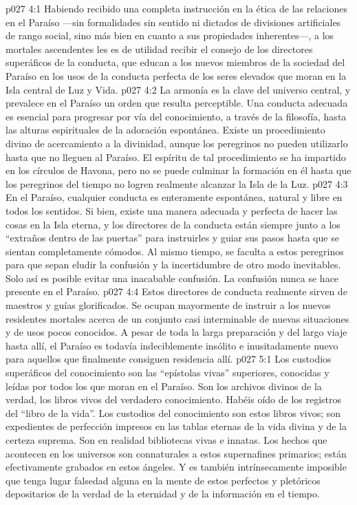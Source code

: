 \vs p027 4:1 Habiendo recibido una completa instrucción en la ética de las relaciones en el Paraíso ---sin formalidades sin sentido ni dictados de divisiones artificiales de rango social, sino más bien en cuanto a sus propiedades inherentes---, a los mortales ascendentes les es de utilidad recibir el consejo de los directores superáficos de la conducta, que educan a los nuevos miembros de la sociedad del Paraíso en los usos de la conducta perfecta de los seres elevados que moran en la Isla central de Luz y Vida.
\vs p027 4:2 La armonía es la clave del universo central, y prevalece en el Paraíso un orden que resulta perceptible. Una conducta adecuada es esencial para progresar por vía del conocimiento, a través de la filosofía, hasta las alturas espirituales de la adoración espontánea. Existe un procedimiento divino de acercamiento a la divinidad, aunque los peregrinos no pueden utilizarlo hasta que no lleguen al Paraíso. El espíritu de tal procedimiento se ha impartido en los círculos de Havona, pero no se puede culminar la formación en él hasta que los peregrinos del tiempo no logren realmente alcanzar la Isla de la Luz.
\vs p027 4:3 En el Paraíso, cualquier conducta es enteramente espontánea, natural y libre en todos los sentidos. Si bien, existe una manera adecuada y perfecta de hacer las cosas en la Isla eterna, y los directores de la conducta están siempre junto a los “extraños dentro de las puertas” para instruirles y guiar sus pasos hasta que se sientan completamente cómodos. Al mismo tiempo, se faculta a estos peregrinos para que sepan eludir la confusión y la incertidumbre de otro modo inevitables. Solo así es posible evitar una inacabable confusión. La confusión nunca se hace presente en el Paraíso.
\vs p027 4:4 Estos directores de conducta realmente sirven de maestros y guías glorificados. Se ocupan mayormente de instruir a los nuevos residentes mortales acerca de un conjunto casi interminable de nuevas situaciones y de usos pocos conocidos. A pesar de toda la larga preparación y del largo viaje hasta allí, el Paraíso es todavía indeciblemente insólito e inusitadamente nuevo para aquellos que finalmente consiguen residencia allí.
\vs p027 5:1 Los custodios superáficos del conocimiento son las “epístolas vivas” superiores, conocidas y leídas por todos los que moran en el Paraíso. Son los archivos divinos de la verdad, los libros vivos del verdadero conocimiento. Habéis oído de los registros del “libro de la vida”. Los custodios del conocimiento son estos libros vivos; son expedientes de perfección impresos en las tablas eternas de la vida divina y de la certeza suprema. Son en realidad bibliotecas vivas e innatas. Los hechos que acontecen en los universos son connaturales a estos supernafines primarios; están efectivamente grabados en estos ángeles. Y es también intrínsecamente imposible que tenga lugar falsedad alguna en la mente de estos perfectos y pletóricos depositarios de la verdad de la eternidad y de la información en el tiempo.
